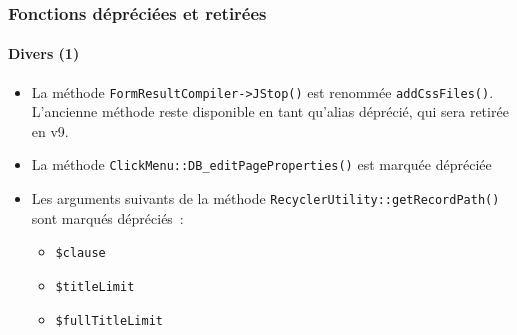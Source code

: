 \begin{frame}[fragile]
	\frametitle{Fonctions dépréciées et retirées}
	\framesubtitle{Divers (1)}

	\begin{itemize}
		\item La méthode \texttt{FormResultCompiler->JStop()} est renommée \texttt{addCssFiles()}.
			L'ancienne méthode reste disponible en tant qu'alias déprécié, qui sera retirée en v9.

		\item La méthode \texttt{ClickMenu::DB\_editPageProperties()} est marquée dépréciée

		\item Les arguments suivants de la méthode \texttt{RecyclerUtility::getRecordPath()}
			sont marqués dépréciés~:

			\begin{itemize}
				\item \texttt{\$clause}
				\item \texttt{\$titleLimit}
				\item \texttt{\$fullTitleLimit}
			\end{itemize}

	\end{itemize}

\end{frame}


